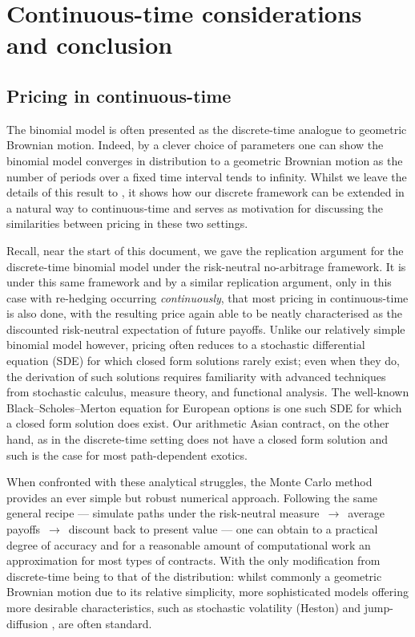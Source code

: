 \documentclass[]{article}
\theoremstyle{remark}
\theoremstyle{plain}
\begin{document}
\section{Continuous-time considerations and conclusion}

\subsection{Pricing in continuous-time}

The binomial model is often presented as the discrete-time analogue to geometric Brownian motion. Indeed, by a clever choice of parameters one can show the binomial model converges in distribution to a geometric Brownian motion as the number of periods over a fixed time interval tends to infinity. Whilst we leave the details of this result to \cite[Chapter~5]{CRR_1979}, it shows how our discrete framework can be extended in a natural way to continuous-time and serves as motivation for discussing the similarities between pricing in these two settings.

Recall, near the start of this document, we gave the replication argument for the discrete-time binomial model under the risk-neutral no-arbitrage framework. It is under this same framework and by a similar replication argument, only in this case with re-hedging occurring \textit{continuously}, that most pricing in continuous-time is also done, with the resulting price again able to be neatly characterised as the discounted risk-neutral expectation of future payoffs. Unlike our relatively simple binomial model however, pricing often reduces to a stochastic differential equation (SDE) for which closed form solutions rarely exist; even when they do, the derivation of such solutions requires familiarity with advanced techniques from stochastic calculus, measure theory, and functional analysis. The well-known Black--Scholes--Merton equation \cite{BSM_1973} for European options is one such SDE for which a closed form solution does exist. Our arithmetic Asian contract, on the other hand, as in the discrete-time setting does not have a closed form solution and such is the case for most path-dependent exotics.

When confronted with these analytical struggles, the Monte Carlo method provides an ever simple but robust numerical approach. Following the same general recipe --- simulate paths under the risk-neutral measure~$\rightarrow$~average payoffs~$\rightarrow$~discount back to present value --- one can obtain to a practical degree of accuracy and for a reasonable amount of computational work an approximation for most types of contracts. With the only modification from discrete-time being to that of the distribution: whilst commonly a geometric Brownian motion due to its relative simplicity, more sophisticated models offering more desirable characteristics, such as stochastic volatility (Heston) \cite{HESTON} and jump-diffusion \cite{JUMP-DIFFUSION}, are often standard.
\end{document}

